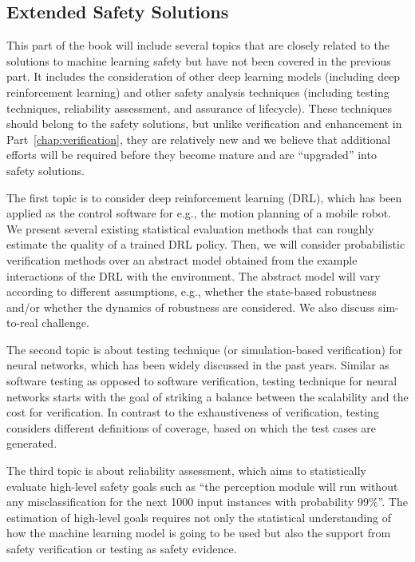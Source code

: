 \begin{partbacktext}
\part{Extended Safety Solutions}\label{chap:lookfurther}

This part of the book will include several topics 
that are closely related to the solutions to machine learning safety but have not been covered in the previous part. It includes the consideration of other deep learning models (including deep reinforcement learning) and other safety analysis techniques (including testing techniques, reliability assessment, and  assurance of lifecycle). These techniques should belong to the safety solutions, but unlike verification and enhancement in Part~\ref{chap:verification}, they are relatively new and we believe that additional efforts will be required before they become mature and are ``upgraded'' into safety solutions. 

The first topic is to consider deep reinforcement learning (DRL), which has been applied as the control software for e.g., the motion planning of a mobile robot. We present several existing statistical evaluation methods that can roughly estimate the quality of a trained DRL policy. Then, we will consider probabilistic verification methods over an abstract model obtained from the example interactions of the DRL with the environment. The abstract model will vary according to different assumptions, e.g., whether the state-based robustness and/or whether the dynamics of robustness are considered. We also discuss sim-to-real challenge. 

The second topic is about testing technique (or simulation-based verification) for neural networks, which has been widely discussed in the past years. Similar as software testing as opposed to software verification, testing technique for neural networks starts with the goal of striking a balance between the scalability and the cost for verification. In contrast to the exhaustiveness of verification, testing considers different definitions of coverage, based on which the test cases are generated. 

The third topic is about reliability assessment, which aims to statistically evaluate high-level safety goals such as ``the perception module will run without any misclassification for the next 1000 input instances with  probability 99\%''. The estimation of high-level goals requires not only the statistical understanding of how the machine learning model is going to be used but also the support from safety verification or testing 
as safety evidence.   


\end{partbacktext}
